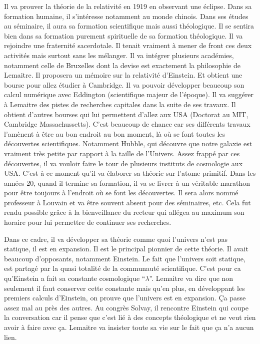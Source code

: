 \documentclass[11pt,a4paper]{article} %
\begin{document}
Il va prouver la théorie de la relativité en 1919 en observant une éclipse.
Dans sa formation humaine, il s'intéresse notamment au monde chinois.
Dans ses études au séminaire, il aura sa formation scientifique mais aussi théologique.
Il se sentira bien dans sa formation purement spirituelle de sa formation théologique.
Il va rejoindre une fraternité sacerdotale.
Il tenait vraiment à mener de front ces deux activités mais surtout sans les mélanger.
Il va intégrer plusieurs académies, notamment celle de Bruxelles dont la devise est exactement la philosophie de Lemaitre.
Il proposera un mémoire sur la relativité d'Einstein.
Et obtient une bourse pour allez étudier à Cambridge.
Il va pouvoir développer beaucoup son calcul numérique avec Eddington (scientifique majeur de l'époque).
Il va suggérer à Lemaitre des pistes de recherches capitales dans la suite de ses travaux.
Il obtient d'autres bourses qui lui permettent d'allez aux USA (Doctorat au MIT, Cambridge Massachussetts).
C'est beaucoup de chance car ses différents travaux l'amènent à être au bon endroit au bon moment, là où se font toutes les découvertes scientifiques.
Notamment Hubble, qui découvre que notre galaxie est vraiment très petite par rapport à la taille de l'Univers.
Assez frappé par ces découvertes, il va vouloir faire le tour de plusieurs instituts de cosmologie aux USA.
C'est à ce moment qu'il va élaborer sa théorie sur l'atome primitif.
Dans les années 20, quand il termine sa formation, il va se livrer à un véritable marathon pour être toujours à l'endroit où se font les découvertes.
Il sera alors nommé professeur à Louvain et va être souvent absent pour des séminaires, etc.
Cela fut rendu possible grâce à la bienveillance du recteur qui allégea au maximum son horaire pour lui permettre de continuer ses recherches.

Dans ce cadre, il va développer sa théorie comme quoi l'univers n'est pas statique, il est en expansion.
Il est le principal pionnier de cette théorie.
Il avait beaucoup d'opposants, notamment Einstein.
Le fait que l'univers soit statique, est partagé par la quasi totalité de la communauté scientifique.
C'est pour ca qu'Einstein a fait sa constante cosmologique ``$\lambda$''.
Lemaitre va dire que non seulement il faut conserver cette constante mais qu'en plus, en développant les premiers calculs d'Einstein, on prouve que l'univers est en expansion.
Ça passe assez mal au près des autres.
Au congrès Solvay, il rencontre Einstein qui coupe la conversation car il pense que c'est lié à des concepts théologique et  ne veut rien avoir à faire avec ça.
Lemaitre va insister toute sa vie sur le fait que ça n'a aucun lien.
\end{document}
